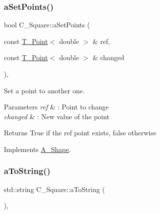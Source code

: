 \subsubsection{\texorpdfstring{a\+Set\+Points()}{aSetPoints()}\hspace{0.1cm}{\footnotesize\ttfamily [2/2]}}
{\footnotesize\ttfamily bool C\+\_\+\+Square\+::a\+Set\+Points (\begin{DoxyParamCaption}\item[{const \hyperlink{classT__Point}{T\+\_\+\+Point}$<$ double $>$ \&}]{ref,  }\item[{const \hyperlink{classT__Point}{T\+\_\+\+Point}$<$ double $>$ \&}]{changed }\end{DoxyParamCaption})\hspace{0.3cm}{\ttfamily [override]}, {\ttfamily [virtual]}}



Set a point to another one. 


\begin{DoxyParams}{Parameters}
{\em ref} & \+: Point to change \\
\hline
{\em changed} & \+: New value of the point \\
\hline
\end{DoxyParams}
\begin{DoxyReturn}{Returns}
True if the ref point exists, false otherwise 
\end{DoxyReturn}


Implements \hyperlink{classA__Shape_a6996f454b337f8425ad13cba3f7a7c35}{A\+\_\+\+Shape}.

\mbox{\label{classC__Square_ab2cada51b25cd35b9a79e461767e56f0}} 
\subsubsection{\texorpdfstring{a\+To\+String()}{aToString()}\hspace{0.1cm}{\footnotesize\ttfamily [1/2]}}
{\footnotesize\ttfamily std\+::string C\+\_\+\+Square\+::a\+To\+String (\begin{DoxyParamCaption}{ }\end{DoxyParamCaption})\hspace{0.3cm}{\ttfamily [override]}, {\ttfamily [virtual]}}



